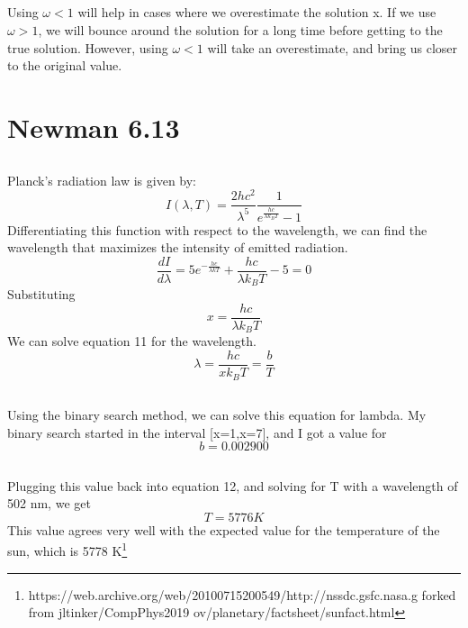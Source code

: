\documentclass[12pt]{article}
\begin{document}
\renewcommand\thesubsection{d}
\subsection{}
Using $\omega < 1$ will help in cases where we overestimate the solution x. If we use $\omega > 1$, we will bounce around the solution for a long time before getting to the true solution. However, using $\omega<1$ will take an overestimate, and bring us closer to the original value.


\section{Newman 6.13}
\renewcommand\thesubsection{a}
\subsection{}

Planck's radiation law is given by:
\begin{equation}
     I(\lambda,T) =\frac{2 hc^2}{\lambda^5}\frac{1}{ e^{\frac{hc}{\lambda k_BT}}-1}
\end{equation}{}
Differentiating this function with respect to the wavelength, we can find the wavelength that maximizes the intensity of emitted radiation.
\begin{equation}
    \frac{dI}{d\lambda} = 5e^{-\frac{hc}{\lambda kT}}+\frac{hc}{\lambda k_BT} - 5 = 0
\end{equation}{}
Substituting
\begin{equation*}
    x = \frac{hc}{\lambda k_BT}
\end{equation*}
We can solve equation 11 for the wavelength.
\begin{equation}
    \lambda = \frac{hc}{xk_BT} = \frac{b}{T}
\end{equation}{}


\renewcommand\thesubsection{b}
\subsection{}
Using the binary search method, we can solve this equation for lambda. My binary search started in the interval [x=1,x=7], and I got a value for
\begin{equation}
    b = 0.002900
\end{equation}{}

\renewcommand\thesubsection{c}
\subsection{}
Plugging this value back into equation 12, and solving for T with a wavelength of 502 nm, we get
\begin{equation}
    T = 5776 K
\end{equation}{}
This value agrees very well with the expected value for the temperature of the sun, which is 5778 K\footnote{https://web.archive.org/web/20100715200549/http://nssdc.gsfc.nasa.g forked from jltinker/CompPhys2019
ov/planetary/factsheet/sunfact.html}
\end{document}

